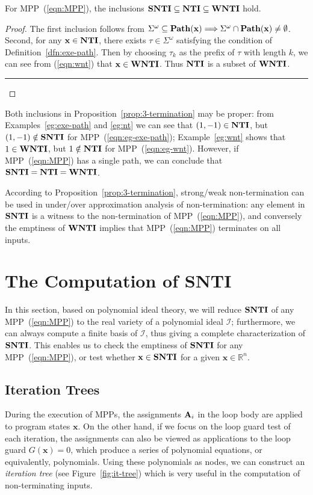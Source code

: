 \documentclass{jssc}
\newcommand{\rulex}{\hfill\rule{1mm}{3mm}}
\newcommand{\I}{\mathcal{I}}
\newcommand{\xx}{\mathbf{x}}
\newcommand{\NTI}{{\bf NTI}}
\newcommand{\SNTI}{{\bf SNTI}}
\newcommand{\WNTI}{{\bf WNTI}}
\begin{document}
\begin{proposition}\label{prop:3-termination}
For MPP~(\ref{eqn:MPP}), the inclusions $\SNTI \subseteq \NTI \subseteq \WNTI$ hold.
\end{proposition}
\begin{proof}
The first inclusion follows from $\Sigma^{\omega} \subseteq {\bf Path}(\xx) \Longrightarrow \Sigma^{\omega} \cap {\bf Path}(\xx) \neq \emptyset$. Second, for any $\xx \in \NTI$, there exists $\tau \in \Sigma^{\omega}$ satisfying the condition of Definition~\ref{dfn:exe-path}. Then by choosing $\tau_k$ as the prefix of $\tau$ with length $k$, we can see from (\ref{eqn:wnt}) that $\xx \in \WNTI$. Thus $\NTI$ is a subset of $\WNTI$. \rulex
\end{proof}

\begin{remark}
Both inclusions in Proposition~\ref{prop:3-termination} may be proper: from Examples~\ref{eg:exe-path} and \ref{eg:nt} we can see that $(1,-1) \in \NTI$, but $(1,-1) \notin \SNTI$ for MPP~(\ref{eqn:eg-exe-path}); Example~\ref{eg:wnt} shows that $1 \in \WNTI$, but $1 \notin \NTI$ for MPP~(\ref{eqn:eg-wnt}). However, if MPP~(\ref{eqn:MPP}) has a single path, we can conclude that $\SNTI=\NTI=\WNTI$.
\end{remark}

According to Proposition~\ref{prop:3-termination}, strong/weak non-termination can be used in under/over approximation analysis of non-termination: any element in $\SNTI$ is a witness to the non-termination of MPP~(\ref{eqn:MPP}), and conversely the emptiness of $\WNTI$ implies that MPP~(\ref{eqn:MPP}) terminates on all inputs.


\section{The Computation of SNTI}\label{sec:snt}
In this section, based on polynomial ideal theory, we will reduce $\SNTI$ of any MPP~(\ref{eqn:MPP}) to the real variety of a polynomial ideal $\I$; furthermore, we can always compute a finite basis of $\I$, thus giving a complete characterization of $\SNTI$. This enables us to check the emptiness of $\SNTI$ for any MPP~(\ref{eqn:MPP}), or test whether $\xx \in \SNTI$ for a given $\xx \in \mathbb{R}^n$.

\subsection{Iteration Trees}\label{sec:it-tree}
During the execution of MPPs, the assignments ${\bf A}_i$ in the loop body are applied to program states $\xx$. On the other hand, if we focus on the loop guard test of each iteration, the assignments can also be viewed as applications to the loop guard $G(\xx)=0$, which produce a series of polynomial equations, or equivalently, polynomials. Using these polynomials as nodes, we can construct an \emph{iteration tree} (see Figure~\ref{fig:it-tree}) which is very useful in the computation of non-terminating inputs.
\end{document}
